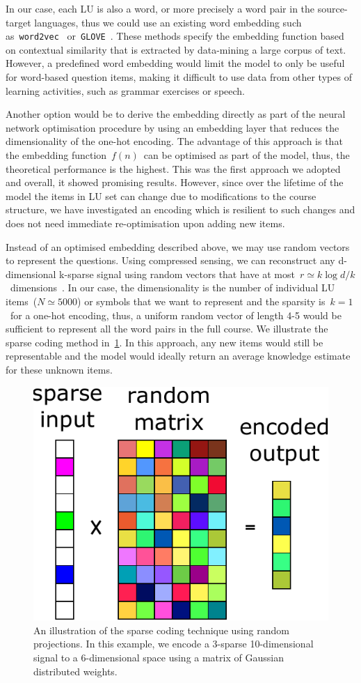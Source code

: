 In our case, each LU is also a word, or more precisely a word pair in the source-target languages, thus we could use an existing word embedding such
as~\texttt{word2vec}~\cite{mikolov2013efficient} or~\texttt{GLOVE}~\cite{pennington2014glove}. These methods specify the embedding function based on contextual similarity that is extracted by data-mining a large corpus of text. However, a predefined word embedding would limit the model to only be useful for word-based question items, making it difficult to use data from other types of learning activities, such as grammar exercises or speech.

Another option would be to derive the embedding directly as part of the neural network optimisation procedure by using an embedding layer that reduces the dimensionality of the one-hot encoding. The advantage of this approach is that the embedding function~$f(n)$~can be optimised as part of the model, thus, the theoretical performance is the highest. This was the first approach we adopted and overall, it showed promising results. However, since over the lifetime of the model the items in LU set can change due to modifications to the course structure, we have investigated an encoding which is resilient to such changes and does not need immediate re-optimisation upon adding new items.

Instead of an optimised embedding described above, we may use random vectors to represent the questions. Using compressed sensing, we can reconstruct any d-dimensional k-sparse signal using random vectors that have at most~$r \simeq k\log d/k$~dimensions~\cite{baraniuk2007compressive}. In our case, the dimensionality is the number of individual LU items~($N \simeq 5000$) or symbols that we want to represent and the sparsity is~$k=1$~for a one-hot encoding, thus, a uniform random vector of length 4-5 would be sufficient to represent all the word pairs in the full course. We illustrate the sparse coding method in~\cref{fig:sparse_coding}. In this approach, any new items would still be representable and the model would ideally return an average knowledge estimate for these unknown items. 

\begin{figure}[ht]
\centering
\includegraphics[width=0.3\linewidth]{figures/lingvist/sparse_coding.pdf}
\caption[An illustration of sparse coding]{An illustration of the sparse coding technique using random projections. In this example, we encode a 3-sparse 10-dimensional signal to a 6-dimensional space using a matrix of Gaussian distributed weights.} 
\label{fig:sparse_coding} 
\end{figure} 

